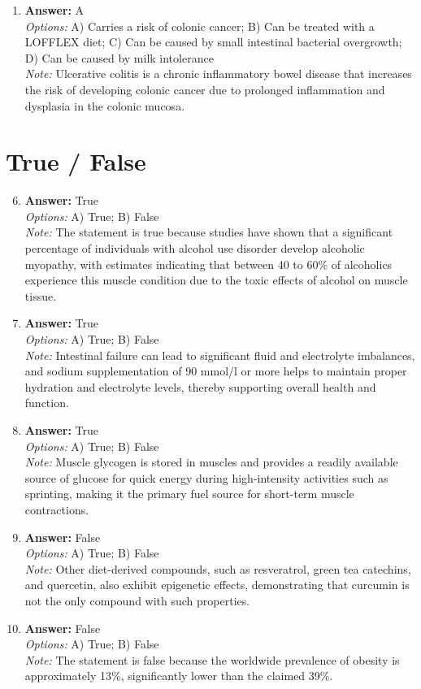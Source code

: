 \documentclass[12pt]{article}
\begin{document}
\begin{enumerate}[label=\arabic*.]
\item \textbf{Answer:} A
\\ \textit{Options:} A) Carries a risk of colonic cancer; B) Can be treated with a LOFFLEX diet; C) Can be caused by small intestinal bacterial overgrowth; D) Can be caused by milk intolerance
\\ \textit{Note:} Ulcerative colitis is a chronic inflammatory bowel disease that increases the risk of developing colonic cancer due to prolonged inflammation and dysplasia in the colonic mucosa.
\end{enumerate}

\section*{True / False}
\begin{enumerate}[label=\arabic*.]
\setcounter{enumi}{5}
\item \textbf{Answer:} True
\\ \textit{Options:} A) True; B) False
\\ \textit{Note:} The statement is true because studies have shown that a significant percentage of individuals with alcohol use disorder develop alcoholic myopathy, with estimates indicating that between 40 to 60\% of alcoholics experience this muscle condition due to the toxic effects of alcohol on muscle tissue.
\item \textbf{Answer:} True
\\ \textit{Options:} A) True; B) False
\\ \textit{Note:} Intestinal failure can lead to significant fluid and electrolyte imbalances, and sodium supplementation of 90 mmol/l or more helps to maintain proper hydration and electrolyte levels, thereby supporting overall health and function.
\item \textbf{Answer:} True
\\ \textit{Options:} A) True; B) False
\\ \textit{Note:} Muscle glycogen is stored in muscles and provides a readily available source of glucose for quick energy during high-intensity activities such as sprinting, making it the primary fuel source for short-term muscle contractions.
\item \textbf{Answer:} False
\\ \textit{Options:} A) True; B) False
\\ \textit{Note:} Other diet-derived compounds, such as resveratrol, green tea catechins, and quercetin, also exhibit epigenetic effects, demonstrating that curcumin is not the only compound with such properties.
\item \textbf{Answer:} False
\\ \textit{Options:} A) True; B) False
\\ \textit{Note:} The statement is false because the worldwide prevalence of obesity is approximately 13\%, significantly lower than the claimed 39\%.
\end{enumerate}
\end{document}
